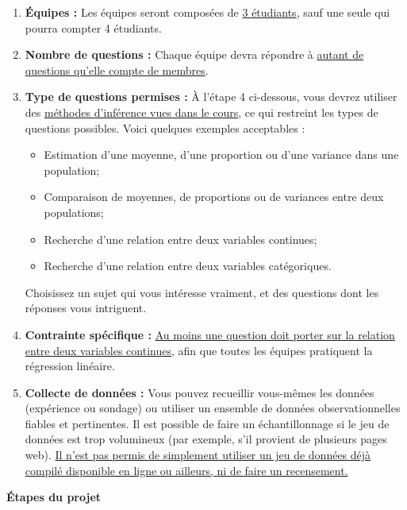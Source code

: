 \documentclass[11pt,french]{article}
\begin{document}
\begin{enumerate}
\item \textbf{Équipes :} Les équipes seront composées de \uline{3 étudiants}, sauf une seule qui pourra compter 4 étudiants.
\item \textbf{Nombre de questions :} Chaque équipe devra répondre à \uline{autant de questions qu’elle compte de membres}.
\item \textbf{Type de questions permises :} À l’étape 4 ci-dessous, vous devrez utiliser des \uline{méthodes d’inférence vues dans le cours}, ce qui restreint les types de questions possibles. Voici quelques exemples acceptables :
\begin{itemize}
\item[$\bullet$] Estimation d’une moyenne, d’une proportion ou d’une variance dans une population;
\item[$\bullet$] Comparaison de moyennes, de proportions ou de variances entre deux populations;
\item[$\bullet$] Recherche d’une relation entre deux variables continues;
\item[$\bullet$] Recherche d’une relation entre deux variables catégoriques.
\end{itemize}
Choisissez un sujet qui vous intéresse vraiment, et des questions dont les réponses vous intriguent.
\item \textbf{Contrainte spécifique :} \uline{Au moins une question doit porter sur la relation entre deux variables continues}, afin que toutes les équipes pratiquent la régression linéaire.
\item \textbf{Collecte de données :} Vous pouvez recueillir vous-mêmes les données (expérience ou sondage) ou utiliser un ensemble de données observationnelles fiables et pertinentes. Il est possible de faire un échantillonnage si le jeu de données est trop volumineux (par exemple, s’il provient de plusieurs pages web). \uline{Il n’est pas permis de simplement utiliser un jeu de données déjà compilé disponible en ligne ou ailleurs, ni de faire un recensement.}
\end{enumerate}


\newpage

\textbf{Étapes du projet}
\end{document}
